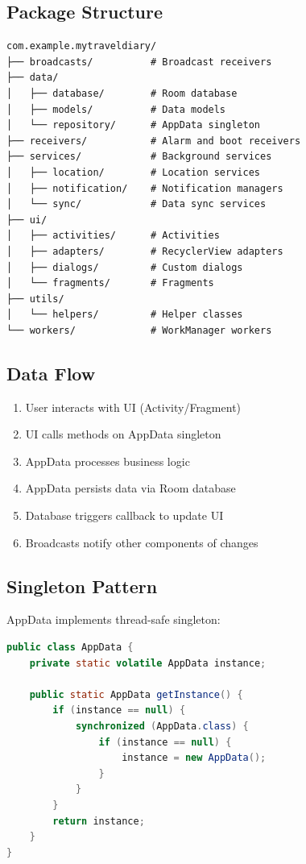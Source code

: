 \documentclass[12pt,a4paper]{article}
\begin{document}
\subsection{Package Structure}
\begin{verbatim}
com.example.mytraveldiary/
├── broadcasts/          # Broadcast receivers
├── data/
│   ├── database/        # Room database
│   ├── models/          # Data models
│   └── repository/      # AppData singleton
├── receivers/           # Alarm and boot receivers
├── services/            # Background services
│   ├── location/        # Location services
│   ├── notification/    # Notification managers
│   └── sync/            # Data sync services
├── ui/
│   ├── activities/      # Activities
│   ├── adapters/        # RecyclerView adapters
│   ├── dialogs/         # Custom dialogs
│   └── fragments/       # Fragments
├── utils/
│   └── helpers/         # Helper classes
└── workers/             # WorkManager workers
\end{verbatim}

\subsection{Data Flow}
\begin{enumerate}
    \item User interacts with UI (Activity/Fragment)
    \item UI calls methods on AppData singleton
    \item AppData processes business logic
    \item AppData persists data via Room database
    \item Database triggers callback to update UI
    \item Broadcasts notify other components of changes
\end{enumerate}

\subsection{Singleton Pattern}
AppData implements thread-safe singleton:

\begin{lstlisting}[language=Java, caption=Singleton Implementation]
public class AppData {
    private static volatile AppData instance;

    public static AppData getInstance() {
        if (instance == null) {
            synchronized (AppData.class) {
                if (instance == null) {
                    instance = new AppData();
                }
            }
        }
        return instance;
    }
}
\end{lstlisting}
\end{document}
